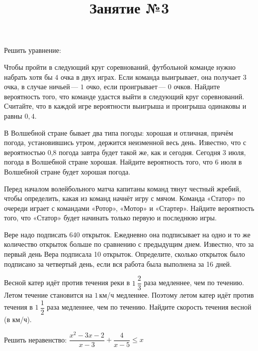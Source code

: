 \begin{listofex}
	\item {}
		\item Решить уравнение:
		\begin{enumcols}[itemcolumns=3]
			\item {}
			\item {}
			\item {}
		\end{enumcols}
		\item Чтобы пройти в следующий круг соревнований, футбольной команде нужно набрать хотя бы \( 4 \) очка в двух играх. Если команда выигрывает, она получает \( 3 \) очка, в случае ничьей --- \( 1 \) очко, если проигрывает --- \( 0 \) очков. Найдите вероятность того, что команде удастся выйти в следующий круг соревнований. Считайте, что в каждой игре вероятности выигрыша и проигрыша одинаковы и равны \( 0,4 \).
		\item В Волшебной стране бывает два типа погоды: хорошая и отличная, причём погода, установившись утром, держится неизменной весь день. Известно, что с вероятностью 0,8 погода завтра будет такой же, как и сегодня. Сегодня 3 июля, погода в Волшебной стране хорошая. Найдите вероятность того, что 6 июля в Волшебной стране будет хорошая погода.
		\item Перед началом волейбольного матча капитаны команд тянут честный жребий, чтобы определить, какая из команд начнёт игру с мячом. Команда «Статор» по очереди играет с командами «Ротор», «Мотор» и «Стартер». Найдите вероятность того, что «Статор» будет начинать только первую и последнюю игры.
		\item Вере надо подписать 640 открыток. Ежедневно она подписывает на одно и то же количество открыток больше по сравнению с предыдущим днем. Известно, что за первый день Вера подписала 10 открыток. Определите, сколько открыток было подписано за четвертый день, если вся работа была выполнена за 16 дней.
		\item Весной катер идёт против течения реки в \( 1\:\dfrac{2}{3} \) раза медленнее, чем по течению. Летом течение становится на \( 1 \) км/ч медленнее. Поэтому летом катер идёт против течения в \( 1\:\dfrac{1}{2} \) раза медленнее, чем по течению. Найдите скорость течения весной (в км/ч).
		\item Решить неравенство: \( \dfrac{x^2-3x-2}{x-3}+\dfrac{4}{x-5}\le x \)
\end{listofex}
\newpage
\title{Занятие №3}
